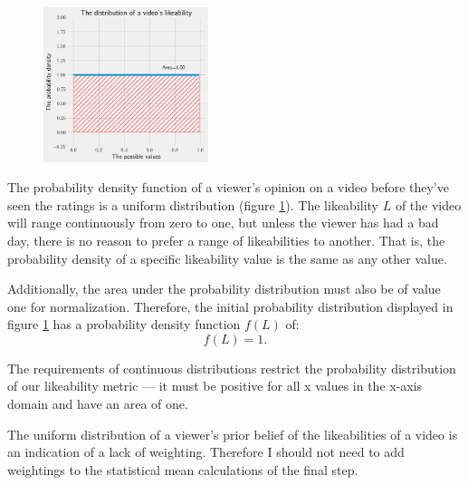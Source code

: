 \documentclass[a4paper,11pt]{article}
\begin{document}


\begin{figure}
    \includegraphics[width=0.43\textwidth,right]{assets/uniform_pdfs.png}
    \caption{}
    \label{fig:uniform}
\end{figure}


The probability density function of a viewer's opinion on a video before they've seen the ratings is a uniform distribution (figure \ref{fig:uniform}). The likeability $L$ of the video will range continuously from zero to one, but unless the viewer has had a bad day, there is no reason to prefer a range of likeabilities to another. That is, the probability density of a specific likeability value is the same as any other value.



Additionally, the area under the probability distribution must also be of value one for normalization. Therefore, the initial probability distribution displayed in figure \ref{fig:uniform} has a probability density function $f(L)$ of:
\[
    f(L) = 1.
\]

The requirements of continuous distributions restrict the probability distribution of our likeability metric --- it must be positive for all x values in the x-axis domain and have an area of one.

The uniform distribution of a viewer's prior belief of the likeabilities of a video is an indication of a lack of weighting. Therefore I should not need to add weightings to the statistical mean calculations of the final step.
\end{document}
